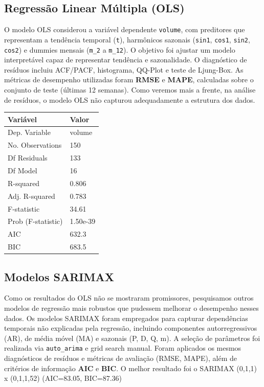 \documentclass{article}
\begin{document}
\subsection*{Regressão Linear Múltipla (OLS)}
O modelo OLS considerou a variável dependente \texttt{volume}, com preditores que representam a tendência temporal (\texttt{t}), harmônicos sazonais (\texttt{sin1}, \texttt{cos1}, \texttt{sin2}, \texttt{cos2}) e dummies mensais (\texttt{m\_2} a \texttt{m\_12}).  
O objetivo foi ajustar um modelo interpretável capaz de representar tendência e sazonalidade. O diagnóstico de resíduos incluiu ACF/PACF, histograma, QQ-Plot e teste de Ljung-Box. As métricas de desempenho utilizadas foram \textbf{RMSE} e \textbf{MAPE}, calculadas sobre o conjunto de teste (últimas 12 semanas). Como veremos mais a frente, na análise de resíduos, o modelo OLS não capturou adequadamente a estrutura dos dados.

\begin{table}[h!]
\centering
\begin{tabular}{ll}
\hline
\textbf{Variável} & \textbf{Valor} \\
\hline
Dep. Variable       & volume \\
No. Observations    & 150 \\
Df Residuals        & 133 \\
Df Model            & 16 \\
R-squared           & 0.806 \\
Adj. R-squared      & 0.783 \\
F-statistic         & 34.61 \\
Prob (F-statistic)  & 1.50e-39 \\
AIC                 & 632.3 \\
BIC                 & 683.5 \\
\hline
\end{tabular}
\end{table}

\subsection*{Modelos SARIMAX}
Como os resultados do OLS não se mostraram promissores, pesquisamos outros modelos de regressão mais robustos que pudessem melhorar o desempenho nesses dados. Os modelos SARIMAX foram empregados para capturar dependências temporais não explicadas pela regressão, incluindo componentes autorregressivos (AR), de média móvel (MA) e sazonais (P, D, Q, m).  
A seleção de parâmetros foi realizada via \texttt{auto\_arima} e grid search manual. Foram aplicados os mesmos diagnósticos de resíduos e métricas de avaliação (RMSE, MAPE), além de critérios de informação \textbf{AIC} e \textbf{BIC}. O melhor resultado foi
o SARIMAX (0,1,1) x (0,1,1,52) (AIC=83.05, BIC=87.36)
\end{document}
